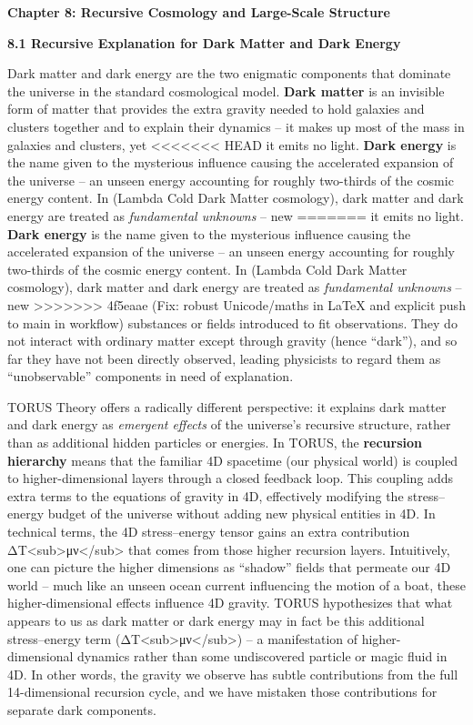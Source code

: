 \documentclass[]{article}
\date{}
\begin{document}
\textbf{Chapter 8: Recursive Cosmology and Large-Scale Structure}

\textbf{8.1 Recursive Explanation for Dark Matter and Dark Energy}

Dark matter and dark energy are the two enigmatic components that
dominate the universe in the standard cosmological model. \textbf{Dark
matter} is an invisible form of matter that provides the extra gravity
needed to hold galaxies and clusters together and to explain their
dynamics -- it makes up most of the mass in galaxies and clusters, yet
<<<<<<< HEAD
it emits no light\hspace{0pt}. \textbf{Dark energy} is the name given to
the mysterious influence causing the accelerated expansion of the
universe -- an unseen energy accounting for roughly two-thirds of the
cosmic energy content. In  (Lambda Cold Dark Matter cosmology), dark
matter and dark energy are treated as \emph{fundamental unknowns} -- new
=======
it emits no light​. \textbf{Dark energy} is the name given to the
mysterious influence causing the accelerated expansion of the universe
-- an unseen energy accounting for roughly two-thirds of the cosmic
energy content. In  (Lambda Cold Dark Matter cosmology), dark matter
and dark energy are treated as \emph{fundamental unknowns} -- new
>>>>>>> 4f5eaae (Fix: robust Unicode/maths in LaTeX and explicit push to main in workflow)
substances or fields introduced to fit observations. They do not
interact with ordinary matter except through gravity (hence ``dark''),
and so far they have not been directly observed, leading physicists to
regard them as ``unobservable'' components in need of explanation.

TORUS Theory offers a radically different perspective: it explains dark
matter and dark energy as \emph{emergent effects} of the universe's
recursive structure, rather than as additional hidden particles or
energies. In TORUS, the \textbf{recursion hierarchy} means that the
familiar 4D spacetime (our physical world) is coupled to
higher-dimensional layers through a closed feedback loop. This coupling
adds extra terms to the equations of gravity in 4D, effectively
modifying the stress--energy budget of the universe without adding new
physical entities in 4D. In technical terms, the 4D stress--energy
tensor gains an extra contribution
ΔT\textless{}sub\textgreater{}μν\textless{}/sub\textgreater{} that comes
from those higher recursion layers​. Intuitively, one can picture the
higher dimensions as ``shadow'' fields that permeate our 4D world --
much like an unseen ocean current influencing the motion of a boat,
these higher-dimensional effects influence 4D gravity. TORUS
hypothesizes that what appears to us as dark matter or dark energy may
in fact be this additional stress--energy term
(ΔT\textless{}sub\textgreater{}μν\textless{}/sub\textgreater{}) -- a
manifestation of higher-dimensional dynamics rather than some
undiscovered particle or magic fluid in 4D​. In other words, the gravity
we observe has subtle contributions from the full 14-dimensional
recursion cycle, and we have mistaken those contributions for separate
dark components.
\end{document}
